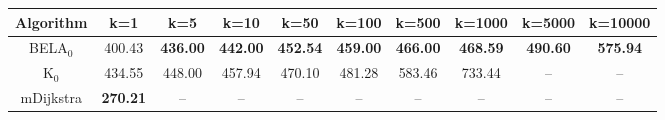 \begin{tabular}{c|ccccccccc}\toprule
Algorithm & k=1 & k=5 & k=10 & k=50 & k=100 & k=500 & k=1000 & k=5000 & k=10000 \\ \midrule
BELA$_0$ & 400.43 & \textbf{436.00} & \textbf{442.00} & \textbf{452.54} & \textbf{459.00} & \textbf{466.00} & \textbf{468.59} & \textbf{490.60} & \textbf{575.94} \\
K$_0$ & 434.55 & 448.00 & 457.94 & 470.10 & 481.28 & 583.46 & 733.44 & -- & -- \\
mDijkstra & \textbf{270.21} & -- & -- & -- & -- & -- & -- & -- & -- \\ \bottomrule 
\end{tabular}
